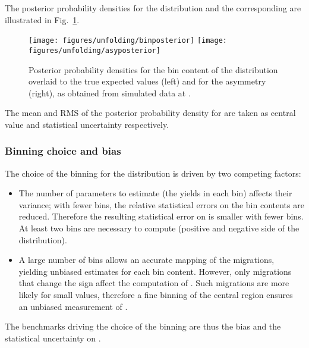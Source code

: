 %
The posterior probability densities for the \dy{} distribution and the corresponding
\ac{} are illustrated in Fig.~\ref{fig:posteriorIncl}.
%
\begin{figure}[!htb]\centering
  \texttt{[image: figures/unfolding/binposterior]}
  \texttt{[image: figures/unfolding/asyposterior]}
  \caption{
    \label{fig:posteriorIncl}
   Posterior probability densities for the bin content of the \dy{}
   distribution overlaid to the true expected values (left) and for
   the asymmetry \ac{} (right), as obtained from simulated data at
   \eighttev{}.
   }
\end{figure}
%
The mean and RMS of the posterior probability density for \ac{} are
taken as central value and statistical uncertainty respectively. 

\subsubsection{Binning choice and bias}
\label{sec:binandbias}

The choice of the binning for the \dy{} distribution is driven by two
competing factors:
\begin{itemize}
\item The number of parameters to estimate (the yields in each \dy{}
  bin) affects their variance; with fewer bins, the relative statistical
  errors on the bin contents are reduced. Therefore the resulting
  statistical error on \ac{} is smaller with fewer bins. At least two
  bins are necessary to compute \ac{} (positive and negative side of
  the \dy{} distribution).
\item A large number of bins allows an accurate mapping of the
  migrations, yielding unbiased estimates for each bin
  content. However, only migrations that change the \dy{} sign affect
  the computation of \ac{}. Such migrations are more likely for small
  \dy{} values, therefore a fine binning of the central \dy{} region
  ensures an unbiased measurement of \ac{}. 
\end{itemize}
The benchmarks driving the choice of the binning are thus the bias and
the statistical uncertainty on \ac{}.

